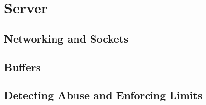 \section{Server}

\subsection{Networking and Sockets}

\subsection{Buffers}

\subsection{Detecting Abuse and Enforcing Limits}
